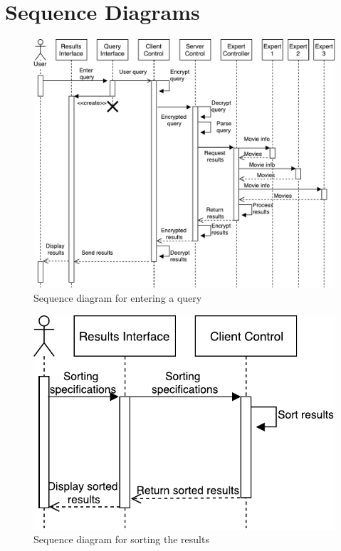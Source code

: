 \documentclass[]{article}
\begin{document}
\section{Sequence Diagrams}
\label{sec:sequence_diagrams}
\begin{figure}[H]
	\includegraphics[width=\textwidth]{SD1}
	\centering
	\caption{Sequence diagram for entering a query}
\end{figure}

\begin{figure}[H]
	\includegraphics[width=\textwidth]{SD2}
	\centering
	\caption{Sequence diagram for sorting the results}
\end{figure}
\end{document}
